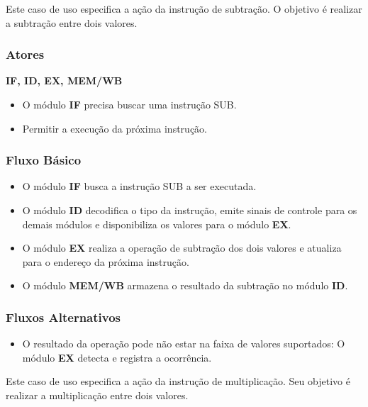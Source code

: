 
Este caso de uso especifica a ação da instrução de subtração. O objetivo é realizar a subtração entre dois valores.
 
\subsubsection*{Atores}
\textbf{IF, ID, EX, MEM/WB}

\preconditions 
\begin{itemize}
 \item O módulo \textbf{IF} precisa buscar uma instrução SUB.
\end{itemize}

\postconditions
\begin{itemize}
  \item Permitir a execução da próxima instrução.
\end{itemize}

\subsubsection*{Fluxo Básico}
\begin{itemize}
\item O módulo \textbf{IF} busca a instrução SUB a ser executada.
\item O módulo \textbf{ID} decodifica o tipo da instrução, emite sinais de controle para os demais módulos e disponibiliza os valores para o módulo \textbf{EX}.
\item O módulo \textbf{EX} realiza a operação de subtração dos dois valores e atualiza para o endereço da próxima instrução.
\item O módulo \textbf{MEM/WB} armazena o resultado da subtração no módulo \textbf{ID}.
\end{itemize}

\subsubsection*{Fluxos Alternativos}
\begin{itemize}
\item O resultado da operação pode não estar na faixa de valores suportados:
\subitem O módulo \textbf{EX} detecta e registra a ocorrência.
\end{itemize}


Este caso de uso especifica a ação da instrução de multiplicação. Seu objetivo é realizar a multiplicação entre dois valores.
 
